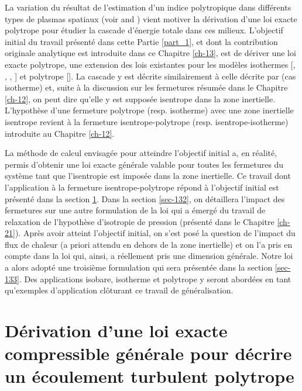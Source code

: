 La variation du résultat de l'estimation d'un indice polytropique dans différents types de plasmas spatiaux (voir  and \cite{livadiotis_thermodynamic_2018}) vient motiver la dérivation d'une loi exacte polytrope pour étudier la cascade d'énergie totale dans ces milieux. L'objectif initial du travail présenté dans cette Partie \ref{part_1}, et dont la contribution originale analytique est introduite dans ce Chapitre \ref{ch-13}, est de dériver une loi exacte  polytrope, une extension des lois existantes pour les modèles  isothermes [\cite{banerjee_exact_2013}, \cite{andres_alternative_2017}, \cite{andres_exact_2018}, \cite{ferrand_compact_2021}] et  polytrope [\cite{banerjee_kolmogorov-like_2014}]. La cascade y est décrite similairement à celle décrite par \cite{galtier_exact_2011} (cas  isotherme) et, suite à la discussion sur les fermetures résumée dans le Chapitre \ref{ch-12}, on peut dire qu'elle y est supposée isentrope dans la zone inertielle. L'hypothèse d'une fermeture polytrope (resp. isotherme) avec une zone inertielle isentrope revient à la fermeture \og isentrope-polytrope\fg{} (resp. isentrope-isotherme) introduite au Chapitre \ref{ch-12}.

La méthode de calcul envisagée pour atteindre l'objectif initial a, en réalité, permis d'obtenir une loi exacte générale valable pour toutes les fermetures du système tant que l'isentropie est imposée dans la zone inertielle. 
Ce travail dont l'application à la fermeture \og isentrope-polytrope \fg{} répond à l'objectif initial est présenté dans la section \ref{sec-131}. 
Dans la section \ref{sec-132}, on détaillera l'impact des fermetures sur une autre formulation de la loi qui a émergé du travail de relaxation de l'hypothèse d'isotropie de pression (présenté dans le Chapitre \ref{ch-21}). 
Après avoir atteint l'objectif initial, on s'est posé la question de l'impact du flux de chaleur (a priori attendu en dehors de la zone inertielle) et on l'a pris en compte dans la loi  qui, ainsi, a réellement pris une dimension générale. Notre loi a alors adopté une troisième formulation qui sera présentée dans la section \ref{sec-133}. Des applications isobare, isotherme et polytrope y seront abordées en tant qu'exemples d'application clôturant ce travail de généralisation.

\section{Dérivation d'une loi exacte compressible générale pour décrire un écoulement turbulent polytrope}
\label{sec-131}


